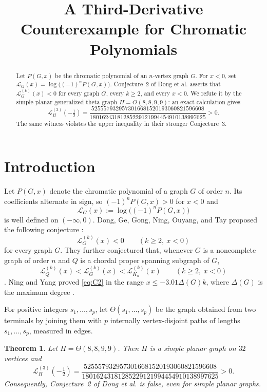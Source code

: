 \documentclass[11pt]{amsart}
\title[A third-derivative counterexample]
{A Third-Derivative Counterexample for Chromatic Polynomials}
\date{}
\newtheorem{theorem}{Theorem}
\theoremstyle{remark}
\newcommand{\Lfun}{\mathcal L}
\newcommand{\ThetaG}{\Theta}
\begin{document}
\begin{abstract}
Let $P(G,x)$ be the chromatic polynomial of an $n$-vertex graph $G$.
For $x<0$, set $\Lfun_G(x)=\log\!\bigl((-1)^nP(G,x)\bigr)$.
Conjecture~2 of Dong et al. asserts that
$\Lfun_G^{(k)}(x)<0$ for every graph $G$, every $k\ge2$, and every $x<0$.
We refute it by the simple planar generalized theta graph
$H=\ThetaG(8,8,9,9)$: an exact calculation gives
\[
 \Lfun_H^{(3)}\!\left(-\tfrac12\right)
 =
 \frac{5255579329573016681520193060821596608}
 {18016243181285229121994454910138997625}>0.
\]
The same witness violates the upper inequality in their stronger Conjecture~3.
\end{abstract}

\maketitle

\section{Introduction}

Let $P(G,x)$ denote the chromatic polynomial of a graph $G$ of order $n$.
Its coefficients alternate in sign, so $(-1)^nP(G,x)>0$ for $x<0$ and
\[
 \Lfun_G(x):=\log\!\bigl((-1)^nP(G,x)\bigr)
\]
is well defined on $(-\infty,0)$. Dong, Ge, Gong, Ning, Ouyang, and Tay
proposed the following conjecture \cite[Conjecture~2]{DongEtAl}:
\begin{equation}\label{eq:C2}
 \Lfun_G^{(k)}(x)<0
 \qquad(k\ge2,\ x<0)
\end{equation}
for every graph $G$. They further conjectured that, whenever $G$ is a
noncomplete graph of order $n$ and $Q$ is a chordal proper spanning subgraph
of $G$,
\begin{equation}\label{eq:C3}
 \Lfun_Q^{(k)}(x)
 <\Lfun_G^{(k)}(x)
 <\Lfun_{K_n}^{(k)}(x)
 \qquad(k\ge2,\ x<0)
\end{equation}
\cite[Conjecture~3]{DongEtAl}.
Ning and Yang proved \eqref{eq:C2} in the range
$x\le-3.01\Delta(G)k$, where $\Delta(G)$ is the maximum degree
\cite[Theorem~1.5]{NingYang}.

For positive integers $s_1,\ldots,s_p$, let
$\ThetaG(s_1,\ldots,s_p)$ be the graph obtained from two terminals by joining
them with $p$ internally vertex-disjoint paths of lengths
$s_1,\ldots,s_p$, measured in edges.

\begin{theorem}\label{thm:main}
Let $H=\ThetaG(8,8,9,9)$. Then $H$ is a simple planar graph on $32$ vertices
and
\[
 \Lfun_H^{(3)}\!\left(-\tfrac12\right)
 =
 \frac{5255579329573016681520193060821596608}
 {18016243181285229121994454910138997625}>0.
\]
Consequently, Conjecture~2 of Dong et al. is false, even for simple planar
graphs.
\end{theorem}
\end{document}
